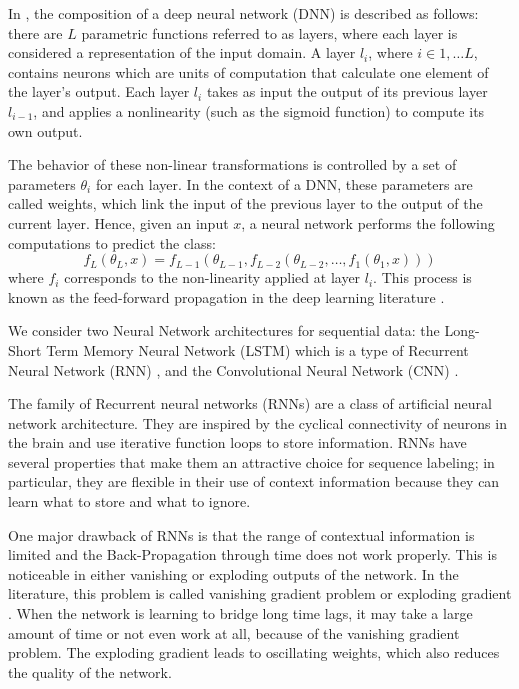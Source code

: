In \cite{Fawaz2019}, the composition of a deep neural network (DNN) is described as follows: there are $L$ parametric functions referred to as layers, where each layer is considered a representation of the input domain. A layer $l_{i}$, where $i \in 1, \ldots L$, contains neurons which are units of computation that calculate one element of the layer's output. Each layer $l_i$ takes as input the output of its previous layer $l_{i-1}$, and applies a nonlinearity (such as the sigmoid function) to compute its own output.

The behavior of these non-linear transformations is controlled by a set of parameters $\theta_{i}$ for each layer. In the context of a DNN, these parameters are called weights, which link the input of the previous layer to the output of the current layer. Hence, given an input $x$, a neural network performs the following computations to predict the class:
\begin{equation}
f_{L}(\theta_{L}, x) = f_{L-1}(\theta_{L-1}, f_{L-2}(\theta_{L-2}, \ldots, f_{1}(\theta_{1},x)))
\end{equation}
where $f_{i}$ corresponds to the non-linearity applied at layer $l_{i}$. This process is known as the feed-forward propagation in the deep learning literature \cite{Goodfellow2016}.

We consider two Neural Network architectures for sequential data: the Long-Short Term Memory Neural Network (LSTM) \cite{HochSchm1997} which is a type of Recurrent Neural Network (RNN) \cite{Rumelhart1986a}, and the Convolutional Neural Network (CNN) \cite{Lecun1989}.

The family of Recurrent neural networks (RNNs) are a class of artificial neural network architecture. They are inspired by the cyclical connectivity of neurons in the brain and use iterative function loops to store information. RNNs have several properties that make them an attractive choice for sequence labeling; in particular, they are flexible in their use of context information because they can learn what to store and what to ignore.

One major drawback of RNNs is that the range of contextual information is limited and the Back-Propagation through time does not work properly. This is noticeable in either vanishing or exploding outputs of the network. In the literature, this problem is called vanishing gradient problem or exploding gradient \cite{Glorot2011}. When the network is learning to bridge long time lags, it may take a large amount of time or not even work at all, because of the vanishing gradient problem. The exploding gradient leads to oscillating weights, which also reduces the quality of the network. 

